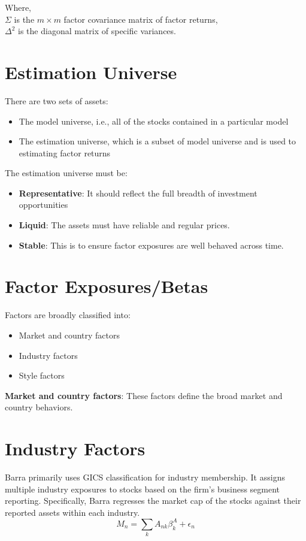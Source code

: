 \documentclass{article}
\begin{document}
Where, \\
\( \Sigma \) is the \( m \times m \) factor covariance matrix of factor returns, \\
\( \Delta^2 \) is the diagonal matrix of specific variances.

\section*{Estimation Universe}
There are two sets of assets:
\begin{itemize}
    \item The model universe, i.e., all of the stocks contained in a particular model
    \item The estimation universe, which is a subset of model universe and is used to estimating factor returns
\end{itemize}

The estimation universe must be:
\begin{itemize}
    \item \textbf{Representative}: It should reflect the full breadth of investment opportunities
    \item \textbf{Liquid}: The assets must have reliable and regular prices.
    \item \textbf{Stable}: This is to ensure factor exposures are well behaved across time.
\end{itemize}

\section*{Factor Exposures/Betas}
Factors are broadly classified into:
\begin{itemize}
    \item Market and country factors
    \item Industry factors
    \item Style factors
\end{itemize}

\textbf{Market and country factors}: These factors define the broad market and country behaviors.

\section*{Industry Factors}
Barra primarily uses GICS classification for industry membership. It assigns multiple industry exposures to stocks based on the firm’s business segment reporting. Specifically, Barra regresses the market cap of the stocks against their reported assets within each industry.
\begin{equation}
M_n = \sum_{k} A_{nk} \beta^A_k + \epsilon_n
\end{equation}
\end{document}
